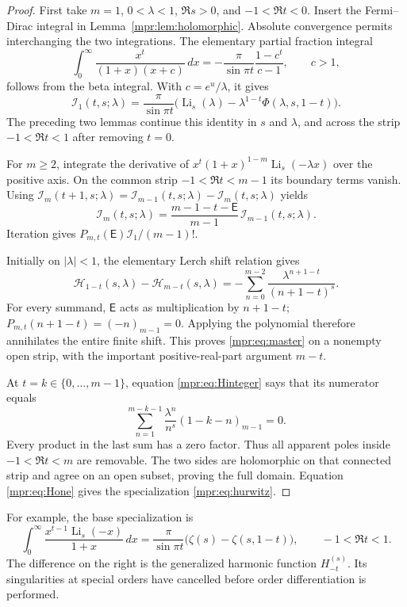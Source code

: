 \documentclass[11pt,letterpaper]{article}
\numberwithin{equation}{section}
\theoremstyle{definition}
\theoremstyle{remark}
\begin{document}
\begin{proof}
First take $m=1$, $0<\lambda<1$, $\Re s>0$, and $-1<\Re t<0$.
Insert the Fermi--Dirac integral in Lemma~\ref{mpr:lem:holomorphic}.
Absolute convergence permits interchanging the two integrations.  The
elementary partial fraction integral
\[
 \int_0^\infty\frac{x^t}{(1+x)(x+c)}\,dx
  =-\frac{\pi}{\sin\pi t}\frac{1-c^t}{c-1},\qquad c>1,
\]
follows from the beta integral.  With $c=e^u/\lambda$, it gives
\[
 \mathcal I_1(t,s;\lambda)
 =\frac\pi{\sin\pi t}
       \bigl(\operatorname{Li}_s(\lambda)
           -\lambda^{1-t}\Phi(\lambda,s,1-t)\bigr).
\]
The preceding two lemmas continue this identity in $s$ and $\lambda$,
and across the strip $-1<\Re t<1$ after removing $t=0$.

For $m\ge2$, integrate the derivative of
$x^t(1+x)^{1-m}\operatorname{Li}_s(-\lambda x)$ over the positive
axis.  On the common strip $-1<\Re t<m-1$ its boundary terms vanish.
Using $\mathcal I_m(t+1,s;\lambda)
=\mathcal I_{m-1}(t,s;\lambda)-\mathcal I_m(t,s;\lambda)$ yields
\begin{equation}\label{mpr:eq:recurrence}
 \mathcal I_m(t,s;\lambda)
 =\frac{m-1-t-\mathsf E}{m-1}\,
                     \mathcal I_{m-1}(t,s;\lambda).
\end{equation}
Iteration gives $P_{m,t}(\mathsf E)\mathcal I_1/(m-1)!$.

Initially on $|\lambda|<1$, the elementary Lerch shift relation gives
\[
 \mathcal H_{1-t}(s,\lambda)-\mathcal H_{m-t}(s,\lambda)
   =-\sum_{n=0}^{m-2}
       \frac{\lambda^{n+1-t}}{(n+1-t)^s}.
\]
For every summand, $\mathsf E$ acts as multiplication by $n+1-t$;
$P_{m,t}(n+1-t)=(-n)_{m-1}=0$.  Applying the polynomial therefore
annihilates the entire finite shift.  This proves
\eqref{mpr:eq:master} on a nonempty open strip, with the important
positive-real-part argument $m-t$.

At $t=k\in\{0,\ldots,m-1\}$, equation
\eqref{mpr:eq:Hinteger} says that its numerator equals
\[
 \sum_{n=1}^{m-k-1}\frac{\lambda^n}{n^s}
                    (1-k-n)_{m-1}=0.
\]
Every product in the last sum has a zero factor.  Thus all apparent
poles inside $-1<\Re t<m$ are removable.  The two sides are
holomorphic on that connected strip and agree on an open subset, proving
the full domain.  Equation \eqref{mpr:eq:Hone} gives the specialization
\eqref{mpr:eq:hurwitz}.
\end{proof}

For example, the base specialization is
\begin{equation}\label{mpr:eq:base}
 \int_0^\infty\frac{x^{t-1}\operatorname{Li}_s(-x)}{1+x}\,dx
  =\frac\pi{\sin\pi t}\bigl(\zeta(s)-\zeta(s,1-t)\bigr),
 \qquad -1<\Re t<1.
\end{equation}
The difference on the right is the generalized harmonic function
$H_{-t}^{(s)}$.  Its singularities at special orders have cancelled
before order differentiation is performed.
\end{document}
